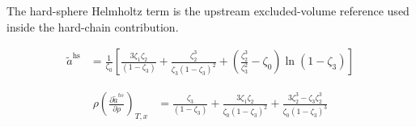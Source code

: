 \documentclass[12pt, letterpaper]{article}
\begin{document}
The hard-sphere Helmholtz term is the upstream excluded-volume reference used inside the hard-chain contribution.

\begin{equation}
    \begin{aligned}
        \tilde{a}^{\mathrm{hs}}
        &=
        \frac{1}{\zeta_{0}}
        \left[
            \frac{3 \zeta_{1} \zeta_{2}}{\left(1-\zeta_{3}\right)}
            +\frac{\zeta_{2}^3}{\zeta_{3}\left(1-\zeta_{3}\right)^2}
            +\left(\frac{\zeta_{2}^3}{\zeta_{3}^2}-\zeta_{0}\right) \ln \left(1-\zeta_{3}\right)
        \right]
    \end{aligned}
    \label{eq:ares_hs}
\end{equation}


\begin{equation}
    \begin{aligned}
        \rho\left(\frac{\partial\tilde{a}^{hs}}{\partial\rho}\right)_{T,x}
        &=
        \frac{\zeta_{3}}{(1-\zeta_{3})}
        +\frac{3\zeta_{1}\zeta_{2}}{\zeta_{0}(1-\zeta_{3})^{2}}
        +\frac{3\zeta_{2}^{3}-\zeta_{3}\zeta_{2}^{3}}{\zeta_{0}(1-\zeta_{3})^{3}}
    \end{aligned}
    \label{eq:hs_ares_dadrho}
\end{equation}

\end{document}
